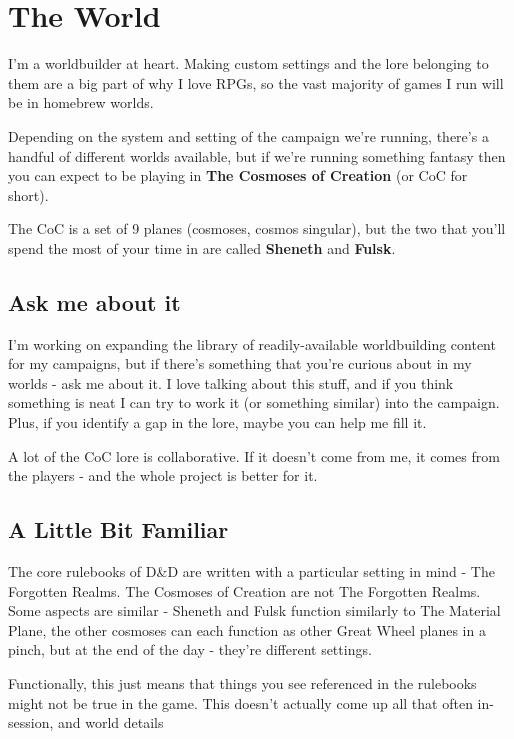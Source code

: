 \section {The World}

I'm a worldbuilder at heart. Making custom settings and the lore belonging to them are a big part of why I love RPGs, so the vast majority of games I run will be in homebrew worlds.

Depending on the system and setting of the campaign we're running, there's a handful of different worlds available, but if we're running something fantasy then you can expect to be playing in \textbf{The Cosmoses of Creation} (or CoC for short). 

The CoC is a set of 9 planes (cosmoses, cosmos singular), but the two that you'll spend the most of your time in are called \textbf{Sheneth} and \textbf{Fulsk}.

\subsection {Ask me about it}

I'm working on expanding the library of readily-available worldbuilding content for my campaigns, but if there's something that you're curious about in my worlds - ask me about it. I love talking about this stuff, and if you think something is neat I can try to work it (or something similar) into the campaign. Plus, if you identify a gap in the lore, maybe you can help me fill it.

A lot of the CoC lore is collaborative. If it doesn't come from me, it comes from the players - and the whole project is better for it.

\subsection {A Little Bit Familiar}

The core rulebooks of D\&D are written with a particular setting in mind - The Forgotten Realms. The Cosmoses of Creation are not The Forgotten Realms. Some aspects are similar - Sheneth and Fulsk function similarly to The Material Plane, the other cosmoses can each function as other Great Wheel planes in a pinch, but at the end of the day - they're different settings.

Functionally, this just means that things you see referenced in the rulebooks might not be true in the game. This doesn't actually come up all that often in-session, and world details

